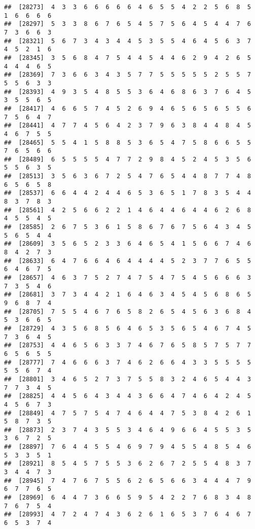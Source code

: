\documentclass[
]{book}
\begin{document}
\begin{verbatim}
##  [28273]  4  3  3  6  6  6  6  6  4  6  5  5  4  2  2  5  6  8  5  1  6  6  6  6
##  [28297]  5  3  3  8  6  7  6  5  4  5  7  5  6  4  5  4  4  7  6  7  3  6  6  3
##  [28321]  5  6  7  3  4  3  4  4  5  3  5  5  4  6  4  5  6  3  7  4  5  2  1  6
##  [28345]  3  5  6  8  4  7  5  4  4  5  4  4  6  2  9  4  2  6  5  4  4  4  6  5
##  [28369]  7  3  6  6  3  4  3  5  7  7  5  5  5  5  5  2  5  5  7  5  5  6  3  3
##  [28393]  4  9  3  5  4  8  5  5  3  6  4  6  8  6  3  7  6  4  5  3  5  5  6  5
##  [28417]  4  6  6  5  7  4  5  2  6  9  4  6  5  6  5  6  5  5  6  7  5  6  4  7
##  [28441]  4  7  7  4  5  6  4  2  3  7  9  6  3  8  4  4  8  4  5  4  6  7  5  5
##  [28465]  5  5  4  1  5  8  8  5  3  6  5  4  7  5  8  6  6  5  5  7  6  5  6  6
##  [28489]  6  5  5  5  5  4  7  7  2  9  8  4  5  2  4  5  3  5  6  5  5  6  3  5
##  [28513]  3  5  6  3  6  7  2  5  4  7  6  5  4  4  8  7  7  4  8  6  5  6  5  8
##  [28537]  6  6  4  4  2  4  4  6  5  3  6  5  1  7  8  3  5  4  4  8  3  7  8  3
##  [28561]  4  2  5  6  6  2  2  1  4  6  4  4  6  4  4  6  2  6  8  4  5  5  4  5
##  [28585]  2  6  7  5  3  6  1  5  8  6  7  6  7  5  6  4  3  4  5  5  6  5  4  4
##  [28609]  3  5  6  5  2  3  3  6  4  6  5  4  1  5  6  6  7  4  6  8  4  2  7  3
##  [28633]  6  4  7  6  6  4  6  4  4  4  4  5  2  3  7  7  6  5  5  6  4  6  7  5
##  [28657]  4  6  3  7  5  2  7  4  7  5  4  7  5  4  5  6  6  6  3  7  3  5  4  6
##  [28681]  3  7  3  4  4  2  1  6  4  6  3  4  5  4  5  6  8  6  5  9  6  8  7  4
##  [28705]  7  5  5  4  6  7  6  5  8  2  6  5  4  5  6  3  6  8  4  5  3  6  6  5
##  [28729]  4  3  5  6  8  5  6  4  6  5  3  5  6  5  4  6  7  4  5  7  3  6  4  5
##  [28753]  4  4  6  5  6  3  3  7  4  6  7  6  5  8  5  7  5  7  7  6  5  6  5  5
##  [28777]  7  4  6  6  6  3  7  4  6  2  6  6  4  3  3  5  5  5  5  5  5  6  7  4
##  [28801]  3  4  6  5  2  7  3  7  5  5  8  3  2  4  6  5  4  4  3  7  7  3  4  5
##  [28825]  4  4  5  6  4  3  4  4  3  6  6  4  7  4  6  4  2  4  5  4  5  6  7  3
##  [28849]  4  7  5  7  5  4  7  4  6  4  4  7  5  3  8  4  2  6  1  5  8  7  3  5
##  [28873]  2  3  7  4  3  5  5  3  4  6  4  9  6  6  4  5  5  3  5  3  6  7  2  5
##  [28897]  7  6  4  4  5  5  4  6  9  7  9  4  5  5  4  8  5  4  6  5  3  3  5  1
##  [28921]  8  5  4  5  7  5  5  3  6  2  6  7  2  5  5  4  8  3  7  3  4  4  7  3
##  [28945]  7  4  7  6  7  5  5  6  2  6  5  6  6  3  4  4  4  7  9  6  7  7  6  5
##  [28969]  6  4  4  7  3  6  6  5  9  5  4  2  2  7  6  8  3  4  8  7  6  7  5  4
##  [28993]  4  7  2  4  7  4  3  6  2  6  1  6  5  3  7  6  4  6  7  6  5  3  7  4

\end{verbatim}
\end{document}
